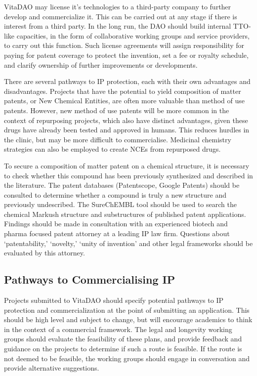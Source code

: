 \documentclass[12pt,letterpaper]{article}
\begin{document}
VitaDAO may license it’s technologies to a third-party company to further develop and commercialize it. This can be carried out at any stage if there is interest from a third party. In the long run, the DAO should build internal TTO-like capacities, in the form of collaborative working groups and service providers, to carry out this function. Such license agreements will assign responsibility for paying for patent coverage to protect the invention, set a fee or royalty schedule, and clarify ownership of further improvements or developments.

There are several pathways to IP protection, each with their own advantages and disadvantages. Projects that have the potential to yield composition of matter patents, or New Chemical Entities, are often more valuable than method of use patents. However, new method of use patents will be more common in the context of repurposing projects, which also have distinct advantages, given these drugs have already been tested and approved in humans. This reduces hurdles in the clinic, but may be more difficult to commercialise. Medicinal chemistry strategies can also be employed to create NCEs from repurposed drugs. 

To secure a composition of matter patent on a chemical structure, it is necessary to check whether this compound has been previously synthesized and described in the literature. The patent databases (Patentscope, Google Patents) should be consulted to determine whether a compound is truly a new structure and previously undescribed. The SureChEMBL tool should be used to search the chemical Markush structure and substructures of published patent applications. Findings should be made in consultation with an experienced biotech and pharma focused patent attorney at a leading IP law firm. Questions about ‘patentability,’ ‘novelty,’ ‘unity of invention’ and other legal frameworks should be evaluated by this attorney.

\subsection{Pathways to Commercialising IP}
Projects submitted to VitaDAO should specify potential pathways to IP protection and commercialization at the point of submitting an application. This should be high level and subject to change, but will encourage academics to think in the context of a commercial framework. The legal and longevity working groups should evaluate the feasibility of these plans, and provide feedback and guidance on the projects to determine if such a route is feasible. If the route is not deemed to be feasible, the working groups should engage in conversation and provide alternative suggestions. 
\end{document}

